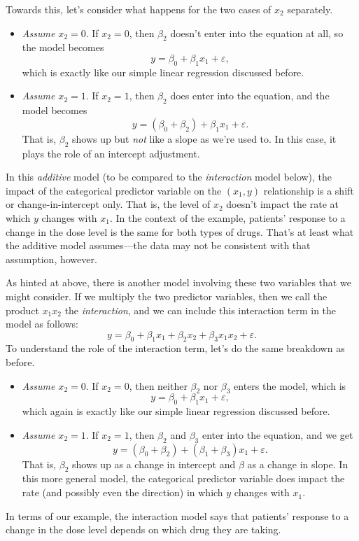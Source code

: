 \documentclass[a4paper, 12pt]{article}
\theoremstyle{plain}
\theoremstyle{definition}
\theoremstyle{remark}
\newcommand{\eps}{\varepsilon}
\begin{document}
Towards this, let's consider what happens for the two cases of $x_2$ separately.
\begin{itemize}
\item {\em Assume $x_2=0$}.  If $x_2=0$, then $\beta_2$ doesn't enter into the equation at all, so the model becomes 
\[ y = \beta_0 + \beta_1 x_1 + \eps, \]
which is exactly like our simple linear regression discussed before.  
\item {\em Assume $x_2=1$}.  If $x_2=1$, then $\beta_2$ does enter into the equation, and the model becomes 
\[ y = (\beta_0 + \beta_2) + \beta_1 x_1 + \eps. \]
That is, $\beta_2$ shows up but {\em not} like a slope as we're used to.  In this case, it plays the role of an intercept adjustment. 
\end{itemize}
In this {\em additive} model (to be compared to the {\em interaction} model below), the impact of the categorical predictor variable on the $(x_1,y)$ relationship is a shift or change-in-intercept only.  That is, the level of $x_2$ doesn't impact the rate at which $y$ changes with $x_1$.  In the context of the example, patients' response to a change in the dose level is the same for both types of drugs.  That's at least what the additive model assumes---the data may not be consistent with that assumption, however.

As hinted at above, there is another model involving these two variables that we might consider.  If we multiply the two predictor variables, then we call the product $x_1x_2$ the {\em interaction}, and we can include this interaction term in the model as follows:
\[ y = \beta_0 + \beta_1 x_1 + \beta_2 x_2 + \beta_3 x_1x_2 + \eps. \]
To understand the role of the interaction term, let's do the same breakdown as before.
\begin{itemize}
\item {\em Assume $x_2=0$}.  If $x_2=0$, then neither $\beta_2$ nor $\beta_3$ enters the model, which is
\[ y = \beta_0 + \beta_1 x_1 + \eps, \]
which again is exactly like our simple linear regression discussed before.  
\item {\em Assume $x_2=1$}.  If $x_2=1$, then $\beta_2$ and $\beta_3$ enter into the equation, and we get 
\[ y = (\beta_0 + \beta_2) + (\beta_1 + \beta_3) x_1 + \eps. \]
That is, $\beta_2$ shows up as a change in intercept and $\beta$ as a change in slope.  In this more general model, the categorical predictor variable does impact the rate (and possibly even the direction) in which $y$ changes with $x_1$.  
\end{itemize}
In terms of our example, the interaction model says that patients' response to a change in the dose level depends on which drug they are taking.  
\end{document}
